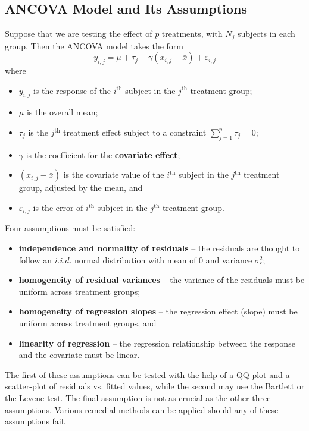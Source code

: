 \subsection{ANCOVA Model and Its Assumptions}
Suppose that we are testing the effect of $p$ treatments, with $N_{j}$ subjects in each group. Then the ANCOVA model takes the form
\begin{equation}\label{eq:ANCOVA}
    y_{i,j}=\mu+\tau_{j}+\gamma (x_{i,j}-\bar{x})+\varepsilon_{i,j}
\end{equation}
where 
\begin{itemize}[noitemsep]
    \item $y_{i,j}$ is the response of the $i^{\text{th}}$ subject in the $j^{\text{th}}$ treatment group;
    \item $\mu$ is the overall mean;
    \item $\tau_{j}$ is the $j^{\text{th}}$ treatment effect subject to a constraint $\sum_{j=1}^{p}\tau_{j}=0$;
    \item $\gamma$ is the coefficient for the \textbf{covariate effect};
    \item $(x_{i,j}-\bar{x})$ is the covariate value of the $i^{\text{th}}$ subject in the $j^{\text{th}}$ treatment group, adjusted by the mean, and
    \item $\varepsilon_{i,j}$ is the error of $i^{\text{th}}$ subject in the $j^{\text{th}}$ treatment group.
\end{itemize}
Four assumptions must be satisfied:
\begin{itemize}[noitemsep]
    \item \textbf{independence and normality of residuals} -- the residuals are thought to follow an ${i.i.d.}$ normal distribution with mean of $0$ and variance $\sigma^{2}_{\varepsilon}$;
    \item \textbf{homogeneity of residual variances} -- the variance of the residuals must be uniform across treatment groups;
    \item \textbf{homogeneity of regression slopes} -- the regression effect (slope) must be uniform across treatment groups, and
    \item \textbf{linearity of regression} -- the regression relationship between the response and the covariate must be linear.
\end{itemize}
The first of these assumptions can be tested with the help of a QQ-plot and a scatter-plot of residuals vs. fitted values, while the second may use the Bartlett or the Levene test. The final assumption is not as crucial as the other three assumptions. Various remedial methods can be applied should any of these assumptions fail.  
